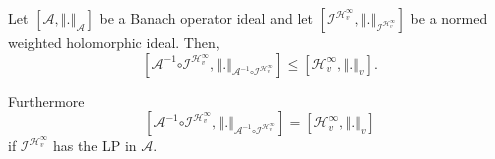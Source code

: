 \documentclass[10pt,a4paper]{amsart}
\begin{document}
\begin{proposition}\label{coincidence}
\label{3}Let $\left[ \mathcal{A},\left\Vert .\right\Vert _{\mathcal{A}}%
\right] $ be a Banach operator ideal and let $\left[ \mathcal{I}^{\mathcal{H}%
_{v}^{\infty }},\left\Vert .\right\Vert _{\mathcal{I}^{\mathcal{H}%
_{v}^{\infty }}}\right] $ be a normed weighted holomorphic ideal. Then,%
\begin{equation*}
\left[ \mathcal{A}^{-1}\mathcal{\circ I}^{\mathcal{H}_{v}^{\infty
}},\left\Vert .\right\Vert _{\mathcal{A}^{-1}\mathcal{\circ I}^{\mathcal{H}%
_{v}^{\infty }}}\right] \leq \left[ \mathcal{H}_{v}^{\infty },\left\Vert
.\right\Vert _{v}\right] .
\end{equation*}

Furthermore%
\begin{equation*}
\left[ \mathcal{A}^{-1}\mathcal{\circ I}^{\mathcal{H}_{v}^{\infty
}},\left\Vert .\right\Vert _{\mathcal{A}^{-1}\mathcal{\circ I}^{\mathcal{H}%
_{v}^{\infty }}}\right] =\left[ \mathcal{H}_{v}^{\infty },\left\Vert
.\right\Vert _{v}\right]
\end{equation*}%
if $\mathcal{I}^{\mathcal{H}_{v}^{\infty }}$ has the LP in $\mathcal{A}$.
\end{proposition}
\end{document}
